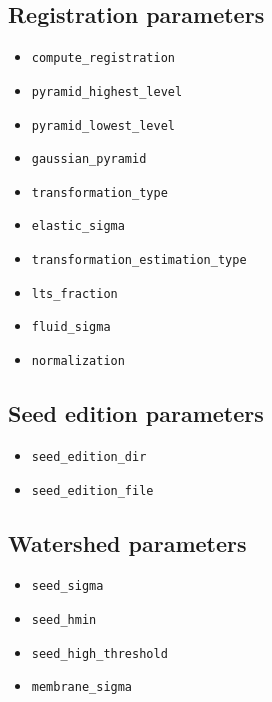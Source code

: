 \subsection{Registration parameters}
\label{sec:cli:parameters:registration}

\begin{itemize}
\itemsep -0.5ex
\item \texttt{compute\_registration}
\item \texttt{pyramid\_highest\_level}
\item \texttt{pyramid\_lowest\_level}
\item \texttt{gaussian\_pyramid}
\item \texttt{transformation\_type}
\item \texttt{elastic\_sigma}
\item \texttt{transformation\_estimation\_type}
\item \texttt{lts\_fraction}
\item \texttt{fluid\_sigma}
\item \texttt{normalization}
\end{itemize}


\subsection{Seed edition parameters}
\label{sec:cli:parameters:seed:edition}

\begin{itemize}
\itemsep -0.5ex
\item \texttt{seed\_edition\_dir}
\item \texttt{seed\_edition\_file}
\end{itemize}


\subsection{Watershed parameters}
\label{sec:cli:parameters:watershed}

\begin{itemize}
\itemsep -0.5ex
\item \texttt{seed\_sigma}
\item \texttt{seed\_hmin}
\item \texttt{seed\_high\_threshold}
\item \texttt{membrane\_sigma}
\end{itemize}











